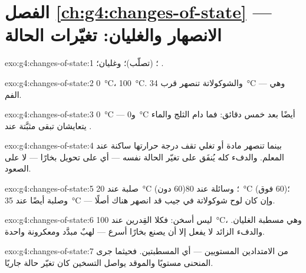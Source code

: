\section*{الفصل \ref{ch:g4:changes-of-state} --- الانصهار والغليان: تغيّرات الحالة}

\begin{solution}{exo:g4:changes-of-state:1}
؛  (تصلّب)؛ وغليان؛ .
\end{solution}

\begin{solution}{exo:g4:changes-of-state:2}
 \qty{0}{\celsius}، 
\qty{100}{\celsius}. والشوكولاتة تنصهر قرب \qty{34}{\celsius}
--- وهي  الفم.
\end{solution}

\begin{solution}{exo:g4:changes-of-state:3}
\qty{0}{\celsius} --- و\qty{0}{\celsius} أيضًا بعد خمس دقائق:
فما دام الثلج والماء يتعايشان تبقى  مثبَّتة عند .
\end{solution}

\begin{solution}{exo:g4:changes-of-state:4}
بينما تنصهر مادة أو تغلي تقف درجة حرارتها ساكنة عند المعلم.
والدفء كله يُنفَق على تغيّر الحالة نفسه --- أي على تحويل 
بخارًا --- لا على الصعود.
\end{solution}

\begin{solution}{exo:g4:changes-of-state:5}
صلبة عند \qty{20}{\celsius} (دون $60$)؛ وسائلة عند
\qty{80}{\celsius} (فوق $60$)؛ وصلبة أيضًا عند \qty{35}{\celsius}
--- وإن كان لوح شوكولاتة في جيب قد انصهر هناك أصلًا.
\end{solution}

\begin{solution}{exo:g4:changes-of-state:6}
ليس أسخن: فكلا القِدرين عند \qty{100}{\celsius}، وهي مسطبة
الغليان. والدفء الزائد لا يفعل إلا أن يصنع بخارًا أسرع ---
لهبٌ مبدَّد ومعكرونة واحدة.
\end{solution}

\begin{solution}{exo:g4:changes-of-state:7}
من الامتدادين المستويين --- أي المسطبتين. فحيثما جرى المنحنى
مستويًا والموقد يواصل التسخين كان تغيّر حالة جاريًا.
\end{solution}

